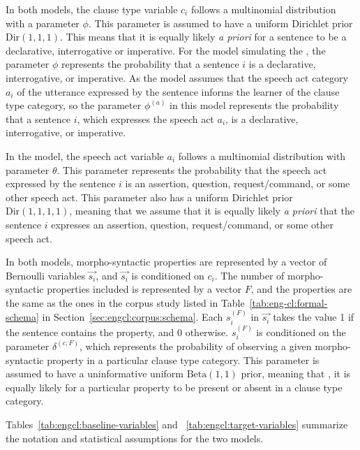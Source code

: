 In both models, the clause type variable $c_{i}$ follows a multinomial distribution with a parameter $\phi$. This parameter is assumed to have a uniform Dirichlet prior $\mbox{Dir}(1,1,1)$. This means that it is equally likely \emph{a priori} for a sentence to be a declarative, interrogative or imperative. For the model simulating the \distlearner{}, the parameter $\phi$ represents the probability that a sentence $i$ is a declarative, interrogative, or imperative. As the \plearnerabbr{} model assumes that the speech act category $a_{i}$ of the utterance expressed by the sentence informs the learner of the clause type category, so the parameter $\phi^{(a)}$ in this model represents the probability that a sentence $i$, which expresses the speech act $a_{i}$, is a declarative, interrogative, or imperative. 

In the \plearnerabbr{} model, the speech act variable $a_{i}$ follows a multinomial distribution with parameter $\theta$. This parameter represents the probability that the speech act expressed by the sentence $i$ is an assertion, question, request/command, or some other speech act. This parameter also has a uniform Dirichlet prior $\mbox{Dir}(1,1,1,1)$, meaning that we assume that it is equally likely \emph{a priori} that the sentence $i$ expresses an assertion, question, request/command, or some other speech act.

In both models, morpho-syntactic properties are represented by a vector of Bernoulli variables $\vec{s_{i}}$, and $\vec{s_{i}}$ is conditioned on $c_{i}$. 
The number of morpho-syntactic properties included is represented by a vector $F$, and the properties are the same as the ones in the corpus study listed in Table~\ref{tab:eng-cl:formal-schema} in Section~\ref{sec:engcl:corpus:schema}. Each $s^{(F)}_{i}$ in $\vec{s_{i}}$ takes the value 1 if the sentence contains the property, and 0 otherwise. $s^{(F)}_{i}$ is conditioned on the parameter $\delta^{(c, F)}$, which represents the probability of observing a given morpho-syntactic property in a particular clause type category. 
This parameter is assumed to have a uninformative uniform $\mbox{Beta}(1,1)$ prior, meaning that , it is equally likely for a particular property to be present or absent in a clause type category. 


Tables~\ref{tab:engcl:baseline-variables} and ~\ref{tab:engcl:target-variables} summarize the notation and statistical assumptions for the two models. 


